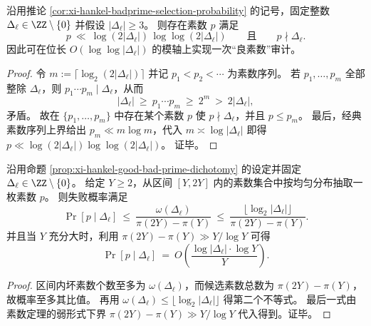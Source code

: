 \begin{corollary}[避开坏素数的对数尺度小素数存在性]\label{cor:xi-hankel-short-prime-avoids-badset}
沿用推论 \ref{cor:xi-hankel-badprime-selection-probability} 的记号，固定整数 \(\Delta_\ell\in\ZZ\setminus\{0\}\) 并假设 \(|\Delta_\ell|\ge 3\)。
则存在素数 \(p\) 满足
\[
\boxed{\;
p\ \ll\ \log(2|\Delta_\ell|)\,\log\log(2|\Delta_\ell|)
\qquad\text{且}\qquad
p\nmid \Delta_\ell.\;}
\]
因此可在位长 \(O(\log\log|\Delta_\ell|)\) 的模轴上实现一次“良素数”审计。
\end{corollary}
\begin{proof}
令 \(m:=\lceil\log_2(2|\Delta_\ell|)\rceil\) 并记 \(p_1<p_2<\cdots\) 为素数序列。
若 \(p_1,\dots,p_m\) 全部整除 \(\Delta_\ell\)，则 \(p_1\cdots p_m\mid \Delta_\ell\)，从而
\[
|\Delta_\ell|\ \ge\ p_1\cdots p_m\ \ge\ 2^m\ >\ 2|\Delta_\ell|,
\]
矛盾。
故在 \(\{p_1,\dots,p_m\}\) 中存在某个素数 \(p\) 使 \(p\nmid \Delta_\ell\)，并且 \(p\le p_m\)。
最后，经典素数序列上界给出 \(p_m\ll m\log m\)，代入 \(m\asymp \log|\Delta_\ell|\) 即得 \(p\ll \log(2|\Delta_\ell|)\log\log(2|\Delta_\ell|)\)。
证毕。
\end{proof}

\begin{corollary}[区间素数抽样的失败概率上界]\label{cor:xi-hankel-badprime-interval-selection-probability}
沿用命题 \ref{prop:xi-hankel-good-bad-prime-dichotomy} 的设定并固定 \(\Delta_\ell\in\ZZ\setminus\{0\}\)。
给定 \(Y\ge 2\)，从区间 \([Y,2Y]\) 内的素数集合中按均匀分布抽取一枚素数 \(p\)。
则失败概率满足
\[
\Pr[p\mid \Delta_\ell]
\ \le\
\frac{\omega(\Delta_\ell)}{\pi(2Y)-\pi(Y)}
\ \le\
\frac{\lfloor \log_2|\Delta_\ell|\rfloor}{\pi(2Y)-\pi(Y)}.
\]
并且当 \(Y\) 充分大时，利用 \(\pi(2Y)-\pi(Y)\gg Y/\log Y\) 可得
\[
\Pr[p\mid \Delta_\ell]
\ =\
O\!\left(\frac{\log|\Delta_\ell|\cdot \log Y}{Y}\right).
\]
\end{corollary}
\begin{proof}
区间内坏素数个数至多为 \(\omega(\Delta_\ell)\)，而候选素数总数为 \(\pi(2Y)-\pi(Y)\)，故概率至多其比值。
再用 \(\omega(\Delta_\ell)\le \lfloor\log_2|\Delta_\ell|\rfloor\) 得第二个不等式。
最后一式由素数定理的弱形式下界 \(\pi(2Y)-\pi(Y)\gg Y/\log Y\) 代入得到。证毕。
\end{proof}

\endinput
